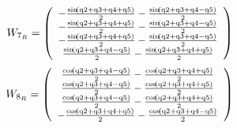 \documentclass[fleqn, a4paper, 5pt, russian]{article}
\begin{document}
\begin{landscape}
\begin{equation}
{}\end{equation}
\begin{equation}
\small{
	W_{7_R}=
	\left(\begin{array}{c}  - \frac{\sin\!\left(\mathrm{q2} + \mathrm{q3} + \mathrm{q4} + \mathrm{q5}\right)}{2} - \frac{\sin\!\left(\mathrm{q2} + \mathrm{q3} + \mathrm{q4} - \mathrm{q5}\right)}{2}\\  - \frac{\sin\!\left(\mathrm{q2} + \mathrm{q3} + \mathrm{q4} + \mathrm{q5}\right)}{2} - \frac{\sin\!\left(\mathrm{q2} + \mathrm{q3} + \mathrm{q4} - \mathrm{q5}\right)}{2}\\  - \frac{\sin\!\left(\mathrm{q2} + \mathrm{q3} + \mathrm{q4} + \mathrm{q5}\right)}{2} - \frac{\sin\!\left(\mathrm{q2} + \mathrm{q3} + \mathrm{q4} - \mathrm{q5}\right)}{2}\\ \frac{\sin\!\left(\mathrm{q2} + \mathrm{q3} + \mathrm{q4} - \mathrm{q5}\right)}{2} - \frac{\sin\!\left(\mathrm{q2} + \mathrm{q3} + \mathrm{q4} + \mathrm{q5}\right)}{2} \end{array}\right)
}\end{equation}
\begin{equation}
\small{
	W_{8_R}=
	\left(\begin{array}{c} \frac{\cos\!\left(\mathrm{q2} + \mathrm{q3} + \mathrm{q4} - \mathrm{q5}\right)}{2} - \frac{\cos\!\left(\mathrm{q2} + \mathrm{q3} + \mathrm{q4} + \mathrm{q5}\right)}{2}\\ \frac{\cos\!\left(\mathrm{q2} + \mathrm{q3} + \mathrm{q4} - \mathrm{q5}\right)}{2} - \frac{\cos\!\left(\mathrm{q2} + \mathrm{q3} + \mathrm{q4} + \mathrm{q5}\right)}{2}\\ \frac{\cos\!\left(\mathrm{q2} + \mathrm{q3} + \mathrm{q4} - \mathrm{q5}\right)}{2} - \frac{\cos\!\left(\mathrm{q2} + \mathrm{q3} + \mathrm{q4} + \mathrm{q5}\right)}{2}\\  - \frac{\cos\!\left(\mathrm{q2} + \mathrm{q3} + \mathrm{q4} + \mathrm{q5}\right)}{2} - \frac{\cos\!\left(\mathrm{q2} + \mathrm{q3} + \mathrm{q4} - \mathrm{q5}\right)}{2} \end{array}\right)
}\end{equation}


\end{landscape}
	
\end{document}
